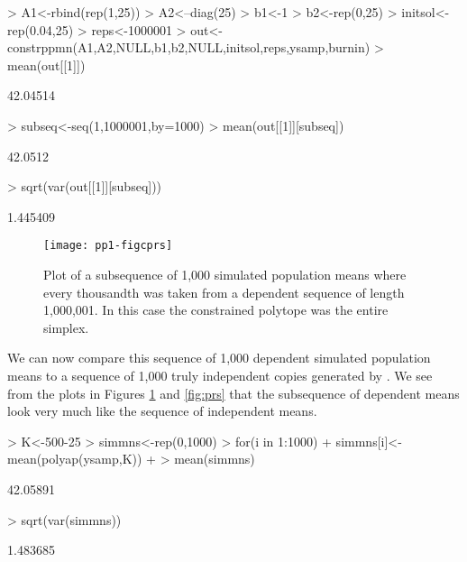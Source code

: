 \documentclass{article}
\begin{document}
\begin{Schunk}
\begin{Sinput}
> A1<-rbind(rep(1,25))
> A2<--diag(25)
> b1<-1
> b2<-rep(0,25)
> initsol<-rep(0.04,25)
> reps<-1000001
> out<-constrppmn(A1,A2,NULL,b1,b2,NULL,initsol,reps,ysamp,burnin)
> mean(out[[1]])
\end{Sinput}
\begin{Soutput}
[1] 42.04514
\end{Soutput}
\begin{Sinput}
> subseq<-seq(1,1000001,by=1000)
> mean(out[[1]][subseq])
\end{Sinput}
\begin{Soutput}
[1] 42.0512
\end{Soutput}
\begin{Sinput}
> sqrt(var(out[[1]][subseq]))
\end{Sinput}
\begin{Soutput}
[1] 1.445409
\end{Soutput}
\end{Schunk}

\begin{figure}
\begin{center}
\texttt{[image: pp1-figcprs]}
\end{center}
\caption{Plot of a subsequence of 1,000 simulated  population 
means where every thousandth was taken 
from a dependent sequence of length 1,000,001.  
In this case the constrained polytope was the entire simplex.}
\label{fig:cprs}
\end{figure}

We can now compare this sequence of 1,000  dependent simulated population
 means to a sequence of 1,000 truly independent copies generated by 
\verb@polyap@. We see from the plots in Figures \ref{fig:cprs} and 
\ref{fig:prs} that the subsequence of dependent means look very much 
like the sequence of independent means.

\begin{Schunk}
\begin{Sinput}
> K<-500-25
> simmns<-rep(0,1000)
> for(i in 1:1000){
+        simmns[i]<-mean(polyap(ysamp,K))
+ }
> mean(simmns)
\end{Sinput}
\begin{Soutput}
[1] 42.05891
\end{Soutput}
\begin{Sinput}
> sqrt(var(simmns))
\end{Sinput}
\begin{Soutput}
[1] 1.483685
\end{Soutput}
\end{Schunk}
\end{document}
